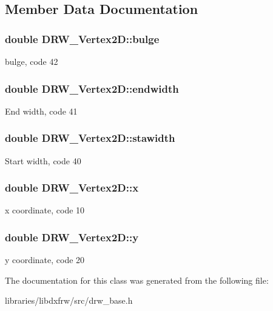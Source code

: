 \subsection{Member Data Documentation}
\hypertarget{classDRW__Vertex2D_a844591ce6d6f01562b831afe4261e99f}{
\subsubsection[{bulge}]{\setlength{\rightskip}{0pt plus 5cm}double D\-R\-W\-\_\-\-Vertex2\-D\-::bulge}}\label{classDRW__Vertex2D_a844591ce6d6f01562b831afe4261e99f}
bulge, code 42 \hypertarget{classDRW__Vertex2D_a810d285d1f81da75a895ade902e8d159}{
\subsubsection[{endwidth}]{\setlength{\rightskip}{0pt plus 5cm}double D\-R\-W\-\_\-\-Vertex2\-D\-::endwidth}}\label{classDRW__Vertex2D_a810d285d1f81da75a895ade902e8d159}
End width, code 41 \hypertarget{classDRW__Vertex2D_a5d3c878a768fa6c10f158a2bbd9726ca}{
\subsubsection[{stawidth}]{\setlength{\rightskip}{0pt plus 5cm}double D\-R\-W\-\_\-\-Vertex2\-D\-::stawidth}}\label{classDRW__Vertex2D_a5d3c878a768fa6c10f158a2bbd9726ca}
Start width, code 40 \hypertarget{classDRW__Vertex2D_abe6dee44053f5d82387209e7c76186c8}{
\subsubsection[{x}]{\setlength{\rightskip}{0pt plus 5cm}double D\-R\-W\-\_\-\-Vertex2\-D\-::x}}\label{classDRW__Vertex2D_abe6dee44053f5d82387209e7c76186c8}
x coordinate, code 10 \hypertarget{classDRW__Vertex2D_a45e73443961543c05bff340dfe14cb8e}{
\subsubsection[{y}]{\setlength{\rightskip}{0pt plus 5cm}double D\-R\-W\-\_\-\-Vertex2\-D\-::y}}\label{classDRW__Vertex2D_a45e73443961543c05bff340dfe14cb8e}
y coordinate, code 20 

The documentation for this class was generated from the following file\-:\begin{DoxyCompactItemize}
\item 
libraries/libdxfrw/src/drw\-\_\-base.\-h\end{DoxyCompactItemize}
